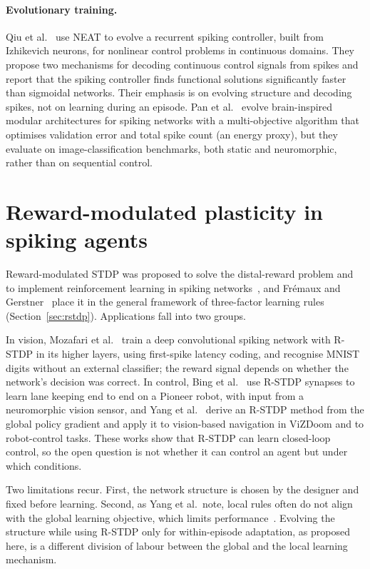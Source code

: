 \paragraph{Evolutionary training.}
Qiu et al.~\cite{qiu2018evolving} use NEAT to evolve a recurrent spiking controller, built from Izhikevich neurons, for nonlinear control problems in continuous domains.
They propose two mechanisms for decoding continuous control signals from spikes and report that the spiking controller finds functional solutions significantly faster than sigmoidal networks.
Their emphasis is on evolving structure and decoding spikes, not on learning during an episode.
Pan et al.~\cite{zhang2024brain} evolve brain-inspired modular architectures for spiking networks with a multi-objective algorithm that optimises validation error and total spike count (an energy proxy), but they evaluate on image-classification benchmarks, both static and neuromorphic, rather than on sequential control.

\section{Reward-modulated plasticity in spiking agents}
\label{sec:sota-rstdp}

Reward-modulated STDP was proposed to solve the distal-reward problem and to implement reinforcement learning in spiking networks~\cite{izhikevich2007,florian2007,legenstein2008}, and Fr\'emaux and Gerstner~\cite{fremaux2016} place it in the general framework of three-factor learning rules (Section~\ref{sec:rstdp}).
Applications fall into two groups.

In vision, Mozafari et al.~\cite{mozafari2018} train a deep convolutional spiking network with R-STDP in its higher layers, using first-spike latency coding, and recognise MNIST digits without an external classifier; the reward signal depends on whether the network's decision was correct.
In control, Bing et al.~\cite{bing2018lane} use R-STDP synapses to learn lane keeping end to end on a Pioneer robot, with input from a neuromorphic vision sensor, and Yang et al.~\cite{yang2025svpg} derive an R-STDP method from the global policy gradient and apply it to vision-based navigation in ViZDoom and to robot-control tasks.
These works show that R-STDP can learn closed-loop control, so the open question is not whether it can control an agent but under which conditions.

Two limitations recur.
First, the network structure is chosen by the designer and fixed before learning.
Second, as Yang et al.\ note, local rules often do not align with the global learning objective, which limits performance~\cite{yang2025svpg}.
Evolving the structure while using R-STDP only for within-episode adaptation, as proposed here, is a different division of labour between the global and the local learning mechanism.

